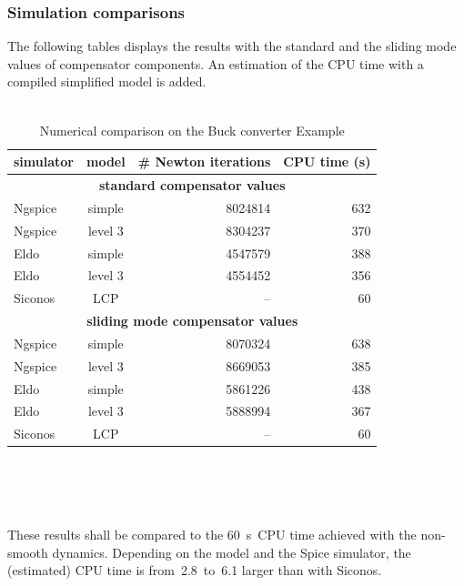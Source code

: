 \subsubsection{Simulation comparisons}
The following tables displays the results with the standard and the sliding mode values of compensator components. An estimation of the CPU time with a compiled simplified model is added.
\\
\\
\begin{table}
  \centering
  \begin{tabular}{|l|c|r|r|}
\hline
simulator & model &
{ \# Newton  iterations}
&
{ CPU  time (s)}
\\
\hline
\multicolumn{4}{|c|}{\textbf{standard compensator values}}\\
\hline
{\sc Ngspice} & simple   & 8024814 & 632 \\
{\sc Ngspice} & level 3  & 8304237 & 370 \\
\hline
{\sc Eldo}    & simple   & 4547579 & 388 \\
{\sc Eldo}    & level 3  & 4554452 & 356 \\
\hline
{\sc Siconos}    & LCP   & --  & 60 \\
\hline
\multicolumn{4}{|c|}{\textbf{sliding mode compensator values}}\\
\hline
{\sc Ngspice} & simple   & 8070324 & 638 \\
{\sc Ngspice} & level 3  & 8669053 & 385 \\
\hline
{\sc Eldo}    & simple   & 5861226 & 438 \\
{\sc Eldo}    & level 3  & 5888994 & 367 \\
\hline
{\sc Siconos}    & LCP   & -- & 60 \\
\hline
\end{tabular}\\
\caption{Numerical comparison on the Buck converter Example}
\label{tab:buck}
\end{table}
\\
\\
These results shall be compared to the 60~s~CPU time achieved with the non-smooth dynamics.
Depending on the model and the {\sc Spice} simulator, the (estimated) CPU time is from~2.8~to~6.1
larger than with {\sc Siconos}. \\

